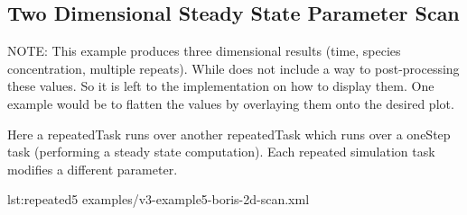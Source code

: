 \subsection{Two Dimensional Steady State Parameter Scan}
NOTE: This example produces three dimensional results (time, species concentration, multiple repeats). While \LoneVtwo does not include a way to post-processing these values. So it is left to the implementation on how to display them. One example would be to flatten the values by overlaying them onto the desired plot. 

Here a repeatedTask runs over another repeatedTask which runs over a oneStep task (performing a steady state computation). Each repeated simulation task modifies a different parameter.


{lst:repeated5}
{examples/v3-example5-boris-2d-scan.xml}
